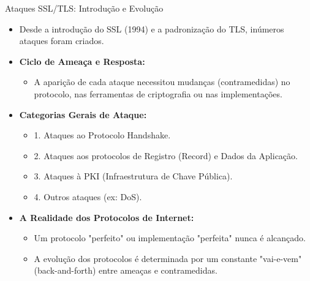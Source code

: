\begin{frame}{Ataques SSL/TLS: Introdução e Evolução}
    \begin{itemize}
        \item Desde a introdução do SSL (1994) e a padronização do TLS, inúmeros ataques foram criados.

        \item \textbf{Ciclo de Ameaça e Resposta:}
              \begin{itemize}
                  \item A aparição de cada ataque necessitou mudanças (contramedidas) no protocolo, nas ferramentas de criptografia ou nas implementações.
              \end{itemize}

        \item \textbf{Categorias Gerais de Ataque:}
              \begin{itemize}
                  \item 1. Ataques ao Protocolo Handshake.
                  \item 2. Ataques aos protocolos de Registro (Record) e Dados da Aplicação.
                  \item 3. Ataques à PKI (Infraestrutura de Chave Pública).
                  \item 4. Outros ataques (ex: DoS).
              \end{itemize}

        \item \textbf{A Realidade dos Protocolos de Internet:}
              \begin{itemize}
                  \item Um protocolo "perfeito" ou implementação "perfeita" nunca é alcançado.
                  \item A evolução dos protocolos é determinada por um constante "vai-e-vem" (back-and-forth) entre ameaças e contramedidas.
              \end{itemize}
    \end{itemize}
\end{frame}

